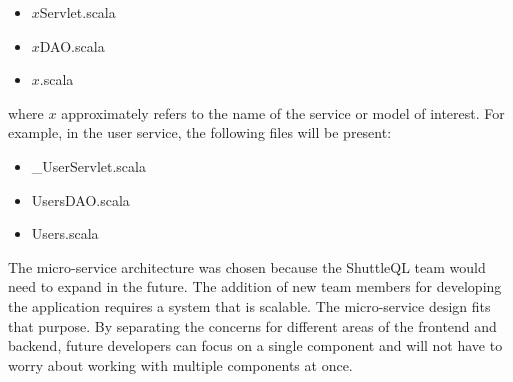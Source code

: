 \documentclass{article}
\begin{document}
\begin{itemize}
  \item $x$Servlet.scala
  \item $x$DAO.scala
  \item $x$.scala
\end{itemize}

where $x$ approximately refers to the name of the service or model of interest. For example, in the user service, the following files will be present:

\begin{itemize}
  \item \_UserServlet.scala
  \item UsersDAO.scala
  \item Users.scala
\end{itemize}

The micro-service architecture was chosen because the ShuttleQL team would need to expand in the future. The addition of new team members for developing the application requires a system that is scalable. The micro-service design fits that purpose. By separating the concerns for different areas of the frontend and backend, future developers can focus on a single component and will not have to worry about working with multiple components at once.
\end{document}
